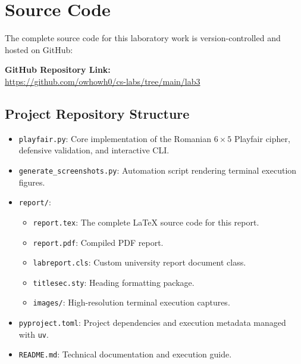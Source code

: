\documentclass{labreport}
\begin{document}
\section{Source Code}

The complete source code for this laboratory work is version-controlled and hosted on GitHub:

\begin{center}
\textbf{GitHub Repository Link:}\\
\url{https://github.com/owhowh0/cs-labs/tree/main/lab3}
\end{center}

\subsection{Project Repository Structure}
\begin{itemize}
    \item \texttt{playfair.py}: Core implementation of the Romanian $6 \times 5$ Playfair cipher, defensive validation, and interactive CLI.
    \item \texttt{generate\_screenshots.py}: Automation script rendering terminal execution figures.
    \item \texttt{report/}:
    \begin{itemize}
        \item \texttt{report.tex}: The complete \LaTeX{} source code for this report.
        \item \texttt{report.pdf}: Compiled PDF report.
        \item \texttt{labreport.cls}: Custom university report document class.
        \item \texttt{titlesec.sty}: Heading formatting package.
        \item \texttt{images/}: High-resolution terminal execution captures.
    \end{itemize}
    \item \texttt{pyproject.toml}: Project dependencies and execution metadata managed with \texttt{uv}.
    \item \texttt{README.md}: Technical documentation and execution guide.
\end{itemize}
\end{document}
